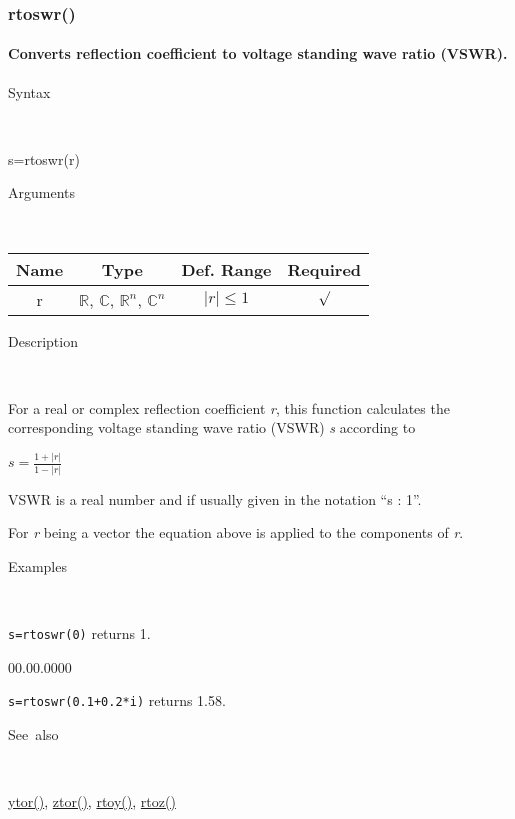 \newpage
{}


\subsubsection*{\hypertarget{rtoswr}{}{\Large rtoswr()}}


\paragraph{\label{par:rtoswr}Converts reflection coefficient to voltage standing
wave ratio (VSWR).}

\begin{description}
\item [Syntax]~
\end{description}
s=rtoswr(r)

\begin{description}
\item [Arguments]~
\end{description}
\begin{tabular}{|c|c|c|c|}
\hline 
Name&
Type&
Def. Range&
Required\tabularnewline
\hline
\hline 
r&
$\mathbb{R}$, $\mathbb{C}$, $\mathbb{R}^{n}$, $\mathbb{C}^{n}$&
$\left|r\right|\leq1$&
$\surd$\tabularnewline
\hline
\end{tabular}

\begin{description}
\item [Description]~
\end{description}
For a real or complex reflection coefficient \textit{r}, this function
calculates the corresponding voltage standing wave ratio (VSWR) \textit{s}
according to 

\medskip{}
$s={\displaystyle \frac{1+\left|r\right|}{1-\left|r\right|}}$
\medskip{}

\noindent VSWR is a real number and if usually given in the notation
{}``s : 1''.

\noindent For \textit{r} being a vector the equation above is applied
to the components of \textit{r}.

\begin{description}
\item [Examples]~
\end{description}
\texttt{s=rtoswr(0)} returns 1.

\begin{lyxlist}{00.00.0000}
\item [\texttt{s=rtoswr(0.1+0.2{*}i)}]returns 1.58.
\end{lyxlist}
\begin{description}
\item [See~also]~
\end{description}
\textcolor{blue}{\hyperlink{ytor}{ytor()}}\textcolor{black}{,} \textcolor{blue}{\hyperlink{ztor}{ztor()}}\textcolor{black}{,}
\textcolor{blue}{\hyperlink{rtoy}{rtoy()}}\textcolor{black}{,} \textcolor{blue}{\hyperlink{rtoz}{rtoz()}}


